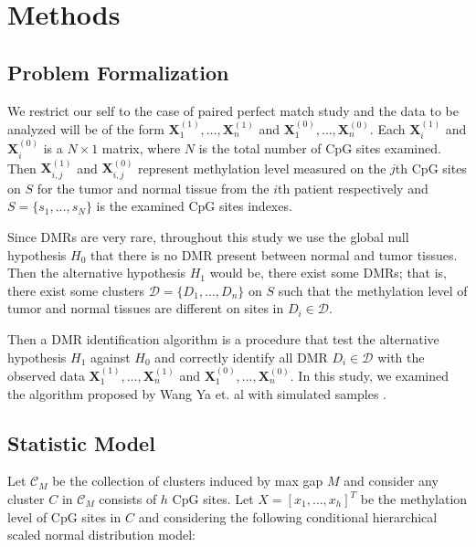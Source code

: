 \documentclass{report}
\begin{document}
\chapter{Methods} \label{chapter 3}


\section{Problem Formalization} \label{section : problem formulization}
\par
We restrict our self to the case of paired perfect match study and the data to be analyzed will be of the form 
 $\mathbf{X}_1^{(1)}, \ldots, \mathbf{X}_n^{(1)}$ and $\mathbf{X}_1^{(0)}, \ldots, \mathbf{X}_n^{(0)}$. Each $\mathbf{X}_i^{(1)}$ and
 $\mathbf{X}_i^{(0)}$ is a $N \times 1$ matrix, where $N$ is the total number of CpG sites examined. Then
 $\mathbf{X}_{i,j}^{(1)}$ and $\mathbf{X}_{i,j}^{(0)}$ represent methylation level measured on the $j$th CpG sites 
 on $S$ for the tumor and normal tissue from the $i$th patient respectively and $S= \{s_1,\ldots,s_N\}$ is the examined 
 CpG sites indexes.
\par
Since DMRs are very rare, throughout this study we use the global null hypothesis $H_0$ that there is no DMR present between
normal and tumor tissues. Then the alternative hypothesis $H_1$ would be, there exist some DMRs; that is, there exist some
clusters $\mathcal{D} = \{D_1,\ldots,D_n\}$ on $S$ such that the methylation level of tumor and normal tissues are different on sites in $D_i \in \mathcal{D}$.
\par
Then a DMR identification
algorithm is a procedure that test the alternative hypothesis $H_1$ against $H_0$ and correctly identify all DMR $D_i \in \mathcal{D}$ with the observed data 
$\mathbf{X}_1^{(1)}, \ldots, \mathbf{X}_n^{(1)}$ and $\mathbf{X}_1^{(0)}, \ldots, \mathbf{X}_n^{(0)}$. In this study, we examined the algorithm proposed by Wang Ya et. al \cite{wang2017accounting} with simulated samples    .



\section{Statistic Model}
\par
Let $\mathcal{C}_M$ be the collection of clusters induced by max gap $M$ and consider any cluster $C$ in $\mathcal{C}_M$ consists of $h$ CpG sites. 
Let $X = [x_1, \ldots, x_h]^T$ be the methylation level of CpG sites in $C$ and considering the following conditional hierarchical scaled normal distribution model:
\end{document}
